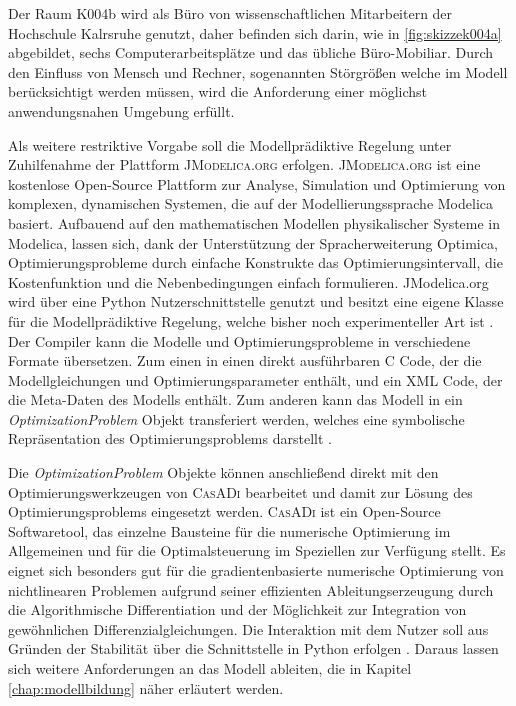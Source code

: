 Der Raum K004b wird als Büro von wissenschaftlichen Mitarbeitern der Hochschule Kalrsruhe genutzt, daher befinden sich darin, wie in \ref{fig:skizzek004a} abgebildet, sechs Computerarbeitsplätze und das übliche Büro-Mobiliar. Durch  den Einfluss von Mensch und Rechner, sogenannten Störgrößen welche im Modell berücksichtigt werden müssen, wird die Anforderung einer möglichst anwendungsnahen Umgebung erfüllt.

Als weitere restriktive Vorgabe soll die Modellprädiktive Regelung unter Zuhilfenahme der Plattform \textsc{JModelica.org} erfolgen. \textsc{JModelica.org} ist eine kostenlose Open-Source Plattform	 zur Analyse, Simulation und Optimierung von komplexen, dynamischen Systemen, die auf der Modellierungssprache Modelica basiert. Aufbauend auf den mathematischen Modellen physikalischer Systeme in Modelica, lassen sich, dank der Unterstützung der Spracherweiterung Optimica, Optimierungsprobleme durch einfache Konstrukte das Optimierungsintervall, die Kostenfunktion und die Nebenbedingungen einfach formulieren. JModelica.org wird über eine Python Nutzerschnittstelle genutzt und besitzt eine eigene Klasse für die Modellprädiktive Regelung, welche bisher noch experimenteller Art ist \cite[S.~1f.]{jmod15}.
Der Compiler kann die Modelle und Optimierungsprobleme in verschiedene Formate übersetzen. Zum einen in einen direkt ausführbaren C Code, der die Modellgleichungen und Optimierungsparameter enthält, und ein XML Code, der die Meta-Daten des Modells enthält. Zum anderen kann das Modell in ein \textit{OptimizationProblem} Objekt transferiert werden, welches eine symbolische Repräsentation des Optimierungsproblems darstellt \cite[S.~12ff.]{jmod15}.

Die \textit{OptimizationProblem} Objekte können anschließend direkt mit den Optimierungswerkzeugen von \textsc{CasADi} bearbeitet und damit zur Lösung des Optimierungsproblems eingesetzt werden. \textsc{CasADi} ist ein Open-Source Softwaretool, das einzelne Bausteine für die numerische Optimierung im Allgemeinen und für die Optimalsteuerung im Speziellen zur Verfügung stellt. Es eignet sich besonders gut für die gradientenbasierte numerische Optimierung von nichtlinearen Problemen aufgrund seiner effizienten Ableitungserzeugung durch die Algorithmische Differentiation und der Möglichkeit zur Integration von gewöhnlichen Differenzialgleichungen. Die Interaktion mit dem Nutzer soll aus Gründen der Stabilität über die Schnittstelle in Python erfolgen \cite[S.~5f.]{casadi}.
Daraus lassen sich weitere Anforderungen an das Modell ableiten, die in Kapitel \ref{chap:modellbildung} näher erläutert werden.


